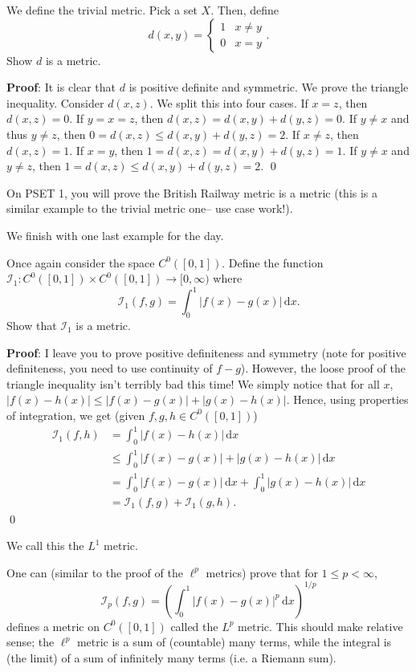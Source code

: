 \begin{example}
We define the trivial metric. Pick a set $X$. Then, define 
\[
d(x,y) = \begin{cases}1 & x\neq y \\
0 & x=y \end{cases}.
\]
Show $d$ is a metric.
\end{example}
\textbf{Proof}: It is clear that $d$ is positive definite and symmetric. We prove the triangle inequality. Consider $d(x,z)$. We split this into four cases. If $x=z$, then $d(x,z) =0$. If $y=x=z$, then $d(x,z) = d(x,y) + d(y,z) = 0$. If $y\neq x$ and thus $y\neq z$, then $0 = d(x,z) \leq d(x,y) + d(y,z) = 2$. If $x\neq z$, then $d(x,z) = 1$. If $x=y$, then $1= d(x,z) = d(x,y) + d(y,z) = 1$. If $y\neq x$ and $y\neq z$, then $1 = d(x,z) \leq d(x,y) + d(y,z) = 2.$ \qed 

\begin{remark}
On PSET 1, you will prove the British Railway metric is a metric (this is a similar example to the trivial metric one-- use case work!).
\end{remark}

We finish with one last example for the day.
\begin{example}
Once again consider the space $C^0([0,1])$. Define the function $\mathcal I_1: C^0([0,1]) \times C^0([0,1]) \to [0,\infty)$ where
\[
\mathcal I_1(f,g) = \int_0^1 |f(x) - g(x)| \,\mathrm dx.
\]
Show that $\mathcal I_1$ is a metric.
\end{example}
\textbf{Proof}: I leave you to prove positive definiteness and symmetry (note for positive definiteness, you need to use continuity of $f-g$). However, the loose proof of the triangle inequality isn't terribly bad this time! We simply notice that for all $x$, $|f(x) - h(x)| \leq |f(x) - g(x)| + |g(x) - h(x)|$. Hence, using properties of integration, we get (given $f,g,h\in C^0([0,1])$)
\begin{align*}
    \mathcal I_1(f,h) &= \int_0^1 |f(x) - h(x)| \,\mathrm dx \\
    &\leq \int_0^1 |f(x) - g(x)| + |g(x) - h(x)| \,\mathrm dx \\
    &= \int_0^1 |f(x) - g(x)|\, \mathrm dx + \int_0^1 |g(x) - h(x)| \,\mathrm dx \\
    &= \mathcal I_1(f,g) + \mathcal I_1(g,h).
\end{align*}
\qed 

We call this the $L^1$ metric. 

\begin{remark}
One can (similar to the proof of the $\ell^p$ metrics) prove that for $1\leq p < \infty$, 
\[
\mathcal I_p(f,g) = \left(\int_0^1 |f(x) - g(x)|^p \,\mathrm dx\right)^{1/p}
\]
defines a metric on $C^0([0,1])$ called the $L^p$ metric. This should make relative sense; the $\ell^p$ metric is a sum of (countable) many terms, while the integral is (the limit) of a sum of infinitely many terms (i.e. a Riemann sum).
\end{remark}